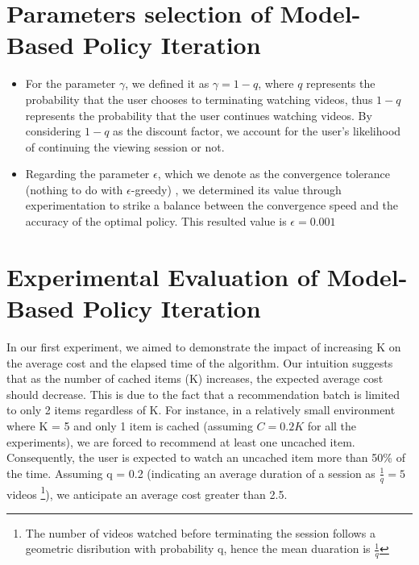 \documentclass[12pt]{article}
\begin{document}
\section*{Parameters selection of Model-Based Policy Iteration}
\begin{itemize}
    \item For the parameter $\gamma$, we defined it as $\gamma = 1 - q$, where $q$ represents the probability that the user
     chooses to terminating watching videos, thus $1-q$ represents the probability that the user
     continues watching videos. By considering $1-q$ as the discount factor, we account for the user's likelihood 
     of continuing the viewing session or not. 

    \item Regarding the parameter $\epsilon$, which we denote as the convergence tolerance (nothing to do with $\epsilon$-greedy) , we determined its value through experimentation to strike a balance between the convergence speed and the accuracy of the optimal policy. This resulted value is $\epsilon = 0.001$
\end{itemize}
\section*{Experimental Evaluation of Model-Based Policy Iteration}
 In our first experiment, we aimed to demonstrate the impact of increasing K on the average cost and the elapsed time of the algorithm. Our intuition suggests that as the number of cached items (K) increases, the expected average cost should decrease. This is due to the fact that a recommendation batch is limited to only 2 items regardless of K.
For instance, in a relatively small environment where K = 5 and only 1 item is cached (assuming $C=0.2K$ for all the experiments), we are forced to recommend at least one uncached item. Consequently, the user is expected to watch an uncached item more than 50\% of the time. Assuming q = 0.2 (indicating an average duration of a session as $\frac{1}{q} = 5$ videos
\footnote[1]{The number of videos watched before terminating the session follows a geometric disribution with probability q, hence
 the mean duaration is $\frac{1}{q}$}), we anticipate an average cost greater than 2.5.
\end{document}
